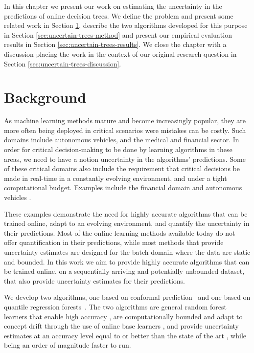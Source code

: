 In this chapter we present our work on estimating the uncertainty
in the predictions of online decision trees. We define the problem
and present some related work in Section \ref{sec:uncertain-trees-background},
describe the two algorithms developed for this purpose in Section
\ref{sec:uncertain-trees-method} and present our empirical evaluation
results in Section \ref{sec:uncertain-trees-results}.
We close the chapter with a discussion placing the work in the
context of our original research question in Section \ref{sec:uncertain-trees-discussion}.

\section{Background}
\label{sec:uncertain-trees-background}

As machine learning methods mature and become increasingly popular, they are more
often being deployed in critical scenarios were mistakes can be costly. Such
domains include autonomous vehicles, and the medical and financial sector.
In order for critical decision-making to be done by learning algorithms in these areas, we need
to have a notion uncertainty in the algorithms' predictions.
Some of these critical domains also include the requirement that critical decisions
be made in real-time in a constantly evolving environment, and under a tight computational budget. Examples include the financial domain \cite{streaming-finance} and autonomous vehicles \cite{av-safety}.

These examples demonstrate the need for highly accurate algorithms that can be trained
online, adapt to an evolving environment, and quantify the uncertainty in their
predictions. Most of the online learning methods available today do not offer
quantification in their predictions, while most methods that provide uncertainty
estimates are designed for the batch domain where the data are static and bounded.
In this work we aim to provide highly accurate algorithms that can be trained
online, on a sequentially arriving and potentially unbounded dataset, that also
provide uncertainty estimates for their predictions.

We develop two algorithms, one based on conformal prediction~\cite{vovk2005algorithmic} and one based on quantile
regression forests~\cite{meinshausen2006quantile}. The two algorithms are general random forest learners that
enable high accuracy \cite{hundreds-classifiers}, are computationally bounded
and adapt to concept drift through the use of online base learners \cite{fimt},
and provide uncertainty estimates at an accuracy level equal to or better
than the state of the art \cite{mondrian-forests-original}, while being an order of magnitude faster to run.

